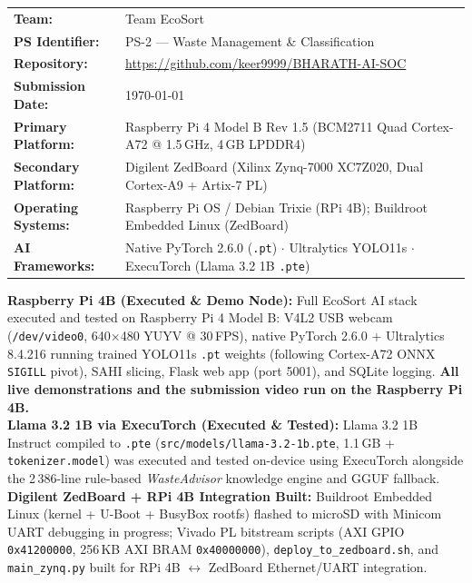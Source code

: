 \documentclass[12pt,a4paper]{article}
\begin{document}
\begin{titlepage}
{\normalsize
\renewcommand{\arraystretch}{1.22}
\begin{tabular}{@{}R{4.0cm}@{\hspace{0.8em}}L{10.2cm}@{}}
  \textbf{Team:}              & Team EcoSort \\
  \textbf{PS Identifier:}     & PS-2 --- Waste Management \& Classification \\
  \textbf{Repository:}        & \url{https://github.com/keer9999/BHARATH-AI-SOC} \\
  \textbf{Submission Date:}   & \today \\
  \textbf{Primary Platform:}  & Raspberry Pi 4 Model B Rev 1.5
                                (BCM2711 Quad Cortex-A72 @ 1.5\,GHz, 4\,GB LPDDR4) \\
  \textbf{Secondary Platform:}& Digilent ZedBoard (Xilinx Zynq-7000 XC7Z020,
                                Dual Cortex-A9 + Artix-7 PL) \\
  \textbf{Operating Systems:} & Raspberry Pi OS / Debian Trixie (RPi 4B);
                                Buildroot Embedded Linux (ZedBoard) \\
  \textbf{AI Frameworks:}     & Native PyTorch 2.6.0 (\texttt{.pt}) $\cdot$ Ultralytics YOLO11s $\cdot$
                                ExecuTorch (Llama 3.2 1B \texttt{.pte}) \\
\end{tabular}
}

\vspace{0.45cm}

\begin{tcolorbox}[
  enhanced,
  colback=ecosortgreen!7, colframe=ecosortgreen!70!black,
  fonttitle=\bfseries\small, title={Hardware Deployment Summary --- Verified Execution Status},
  top=5pt, bottom=5pt, left=8pt, right=8pt, boxrule=0.8pt
]
\footnotesize
\textbf{Raspberry Pi 4B (Executed \& Demo Node):}
Full EcoSort AI stack executed and tested on Raspberry Pi 4 Model B: V4L2 USB webcam
(\texttt{/dev/video0}, 640$\times$480 YUYV @ 30\,FPS), native PyTorch 2.6.0 + Ultralytics 8.4.216
running trained YOLO11s \texttt{.pt} weights (following Cortex-A72 ONNX \texttt{SIGILL} pivot),
SAHI slicing, Flask web app (port 5001), and SQLite logging.
\textbf{All live demonstrations and the submission video run on the Raspberry Pi 4B.}\\[4pt]
\textbf{Llama 3.2 1B via ExecuTorch (Executed \& Tested):}
Llama 3.2 1B Instruct compiled to \texttt{.pte} (\texttt{src/models/llama-3.2-1b.pte},
1.1\,GB + \texttt{tokenizer.model}) was executed and tested on-device using ExecuTorch
alongside the 2\,386-line rule-based \textit{WasteAdvisor} knowledge engine and GGUF fallback.\\[4pt]
\textbf{Digilent ZedBoard + RPi 4B Integration Built:}
Buildroot Embedded Linux (kernel + U-Boot + BusyBox rootfs) flashed to microSD with Minicom
UART debugging in progress; Vivado PL bitstream scripts (AXI GPIO \texttt{0x41200000},
256\,KB AXI BRAM \texttt{0x40000000}), \texttt{deploy\_to\_zedboard.sh}, and
\texttt{main\_zynq.py} built for RPi 4B $\leftrightarrow$ ZedBoard Ethernet/UART integration.
\end{tcolorbox}


\end{titlepage}
\end{document}
